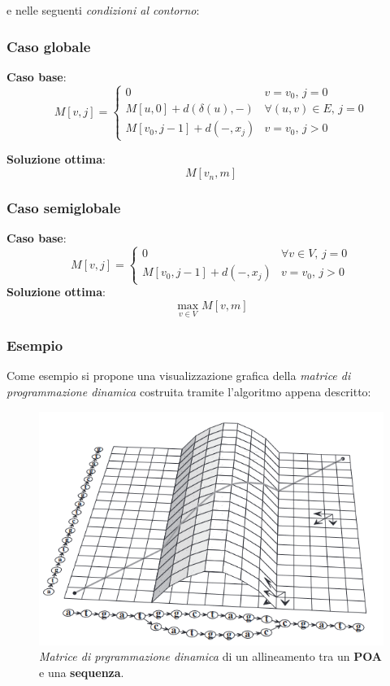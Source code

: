     e nelle seguenti \emph{condizioni al contorno}:
\subsubsection{Caso globale}
    \textbf{Caso base}:
    \begin{equation}
        M[v, j] = \begin{cases}
            0 & v = v_0, \, j = 0 \\
            M[u, 0] + d(\delta(u), -)& \forall (u, v) \in E, \, j = 0 \\
            M[v_0, j - 1] + d(-, x_j)& v = v_0, \, j > 0
        \end{cases}
    \end{equation}

    \textbf{Soluzione ottima}: $$M[v_n, m]$$
    
\subsubsection{Caso semiglobale}
    \textbf{Caso base}:
    \begin{equation}
        M[v, j] = \begin{cases}
            0 & \forall v \in V, \, j = 0 \\
            M[v_0, j - 1] + d(-, x_j) & v = v_0, \, j > 0
        \end{cases}
    \end{equation}
    \textbf{Soluzione ottima}:
    $$\max_{v \in V} M[v, m]$$

\clearpage
\subsubsection{Esempio}
    Come esempio si propone una visualizzazione grafica della \emph{matrice di programmazione dinamica} costruita tramite l'algoritmo appena descritto:
    \begin{figure}[ht]
        \centering
        \includegraphics{images/poa-example.png}
        \caption{\emph{Matrice di prgrammazione dinamica} di un allineamento tra un \textbf{POA} e una \textbf{sequenza}. \cite{POA}}
        \label{fig:poa_example}
    \end{figure}
    
